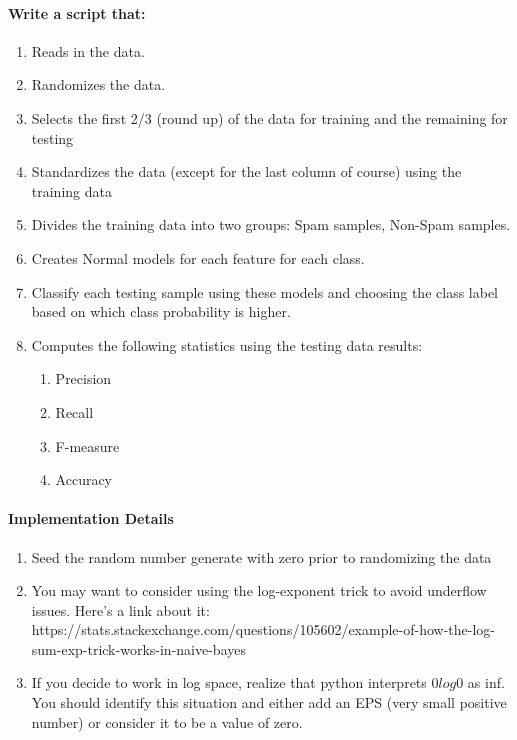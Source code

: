 \documentclass[12pt]{article}
\begin{document}
\paragraph{Write a script that:}
\begin{enumerate}
  \item Reads in the data.
  \item Randomizes the data.
  \item Selects the first 2/3 (round up) of the data for training and the remaining for testing
  \item Standardizes the data (except for the last column of course) using the training data
  \item Divides the training data into two groups: Spam samples, Non-Spam samples.
  \item Creates Normal models for each feature for each class.
  \item Classify each testing sample using these models and choosing the class label based on which class probability is higher.
  \item Computes the following statistics using the testing data results:
    \begin{enumerate}
        \item Precision
        \item Recall
        \item F-measure
        \item Accuracy
    \end{enumerate}
\end{enumerate}


\paragraph{Implementation Details}
\begin{enumerate}
\item Seed the random number generate with zero prior to randomizing the data
\item You may want to consider using the log-exponent trick to avoid underflow issues.  Here's a link about it:  https://stats.stackexchange.com/questions/105602/example-of-how-the-log-sum-exp-trick-works-in-naive-bayes
\item If you decide to work in log space, realize that python interprets $0log0$ as inf.  You should identify this situation and either add an EPS (very small positive number) or consider it to be a value of zero.
\end{enumerate}
\end{document}
